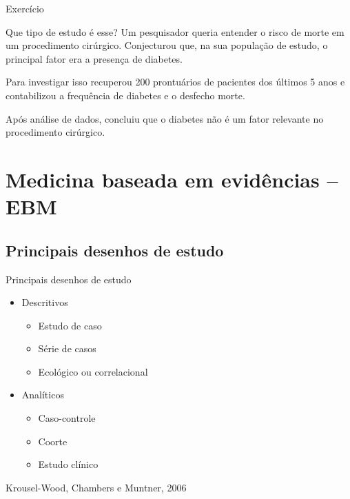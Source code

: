 \documentclass{beamer}
\begin{document}


\begin{frame}[label=exercicio1]{Exercício}
  \begin{block}{Que tipo de estudo é esse?}
    \footnotesize
    Um pesquisador queria entender o risco de morte em um procedimento cirúrgico.
Conjecturou que, na sua população de estudo, o principal fator era a presença de diabetes.

\bigskip
Para investigar isso recuperou 200 prontuários de pacientes dos últimos 5 anos e contabilizou a frequência de diabetes e o desfecho morte.

\bigskip
Após análise de dados, concluiu que o diabetes não é um fator relevante no procedimento cirúrgico.
  \end{block}
\end{frame}

\section[EBM]{Medicina baseada em evidências -- EBM}

\subsection[Desenhos]{Principais desenhos de estudo}

\begin{frame}{Principais desenhos de estudo}
  \begin{itemize}
  \item Descritivos
    \begin{itemize}
    \item Estudo de caso
    \item Série de casos
    \item Ecológico ou correlacional
    \end{itemize}
  \item Analíticos
    \begin{itemize}
    \item Caso-controle
    \item Coorte
    \item Estudo clínico
    \end{itemize}
  \end{itemize}

  \vfill
  \tiny
  \hfill Krousel-Wood, Chambers e Muntner, 2006
\end{frame}
\end{document}
